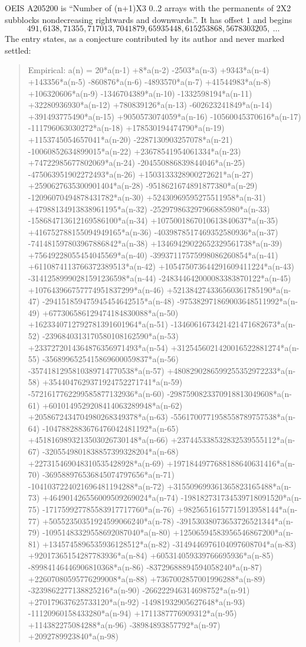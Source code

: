\documentclass[11pt,a4paper]{article}
\theoremstyle{plain}
\theoremstyle{definition}
\begin{document}
OEIS A205200 is ``Number of (n+1)X3 0..2 arrays with the permanents of 2X2 subblocks nondecreasing rightwards and downwards.''. It has offset $1$ and begins
\[
491, 6138, 71355, 717013, 7041879, 65935448, 615253868, 5678303205,\ \dots
\]
The entry states, as a conjecture contributed by its author and never marked settled:
\begin{quote}
Empirical: a(n) = 20*a(n-1) +8*a(n-2) -2503*a(n-3) +9343*a(n-4) +143356*a(n-5) -860876*a(n-6) -4893570*a(n-7) +41544983*a(n-8) +106320606*a(n-9) -1346704389*a(n-10) -1332598194*a(n-11) +32280936930*a(n-12) +780839126*a(n-13) -602623241849*a(n-14) +391493775490*a(n-15) +9050573074059*a(n-16) -10560045370616*a(n-17) -111796063030272*a(n-18) +178530194474790*a(n-19) +1153745054657041*a(n-20) -2287130903257078*a(n-21) -10060852634899015*a(n-22) +23678541954061334*a(n-23) +74722985677802069*a(n-24) -204550886839844046*a(n-25) -475063951902272493*a(n-26) +1503133328900272621*a(n-27) +2590627635300901404*a(n-28) -9518621674891877380*a(n-29) -12096070494878431782*a(n-30) +52430969595275511958*a(n-31) +47988134913838961195*a(n-32) -252979863297966885980*a(n-33) -158684713612169586100*a(n-34) +1075001867010613840637*a(n-35) +416752788155094949165*a(n-36) -4039878517469352580936*a(n-37) -741481597803967886842*a(n-38) +13469429022652329561738*a(n-39) +75649228055454045569*a(n-40) -39937117575998086260854*a(n-41) +6110874113766372389513*a(n-42) +105475073644291609411224*a(n-43) -31412589990281591236598*a(n-44) -248344642000083383870122*a(n-45) +107643966757774951837299*a(n-46) +521384274336560361785190*a(n-47) -294151859475945454642515*a(n-48) -975382971869003648511992*a(n-49) +677306586129474184830088*a(n-50) +1623340712792781391601964*a(n-51) -1346061673421421471682673*a(n-52) -2396840313170580108162590*a(n-53) +2337272014364876356971493*a(n-54) +3125456021420016522881274*a(n-55) -3568996525415869600059837*a(n-56) -3574181295810389714770538*a(n-57) +4808290286599255352972233*a(n-58) +3544047629371924752271741*a(n-59) -5721617762299585877132936*a(n-60) -2987590823370918813049608*a(n-61) +6010149529208414063289948*a(n-62) +2058672434704980268349378*a(n-63) -5561700771958558789757538*a(n-64) -1047882883676476042481192*a(n-65) +4518169893213503026730148*a(n-66) +237445338532832539555112*a(n-67) -3205549801838857399328204*a(n-68) +227315469048310535428928*a(n-69) +1971844977688188640631416*a(n-70) -369588976536845074797656*a(n-71) -1041037224021696481194288*a(n-72) +315509699361365823165488*a(n-73) +464901426556009509269024*a(n-74) -198182731734539718091520*a(n-75) -171759927785583917717760*a(n-76) +98256516157715913958144*a(n-77) +50552350351924599066240*a(n-78) -39153038073653726521344*a(n-79) -10951483329558692087040*a(n-80) +12506594583956546867200*a(n-81) +1345745896535936128512*a(n-82) -3149446976104097608704*a(n-83) +92017365154287783936*a(n-84) +605314059339766695936*a(n-85) -89984146446906810368*a(n-86) -83729688894594058240*a(n-87) +22607080595776299008*a(n-88) +7367002857001996288*a(n-89) -3239862277138825216*a(n-90) -266222946314698752*a(n-91) +270179637625733120*a(n-92) -14981932905627648*a(n-93) -11120960158433280*a(n-94) +1711387776909312*a(n-95) +114382275084288*a(n-96) -38984893857792*a(n-97) +2092789923840*a(n-98)
\end{quote}
\end{document}
